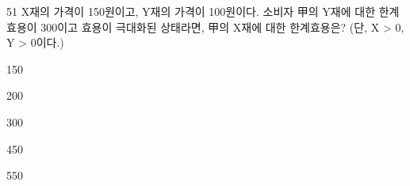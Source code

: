 \begin{question}{51}
X재의 가격이 150원이고, Y재의 가격이 100원이다. 소비자 甲의 Y재에 대한 한계효용이 300이고 효용이 극대화된 상태라면, 甲의 X재에 대한 한계효용은? (단, X > 0, Y > 0이다.)
\begin{choices}
  \item 150
  \item 200
  \item 300
  \item 450
  \item 550
\end{choices}
\end{question}
